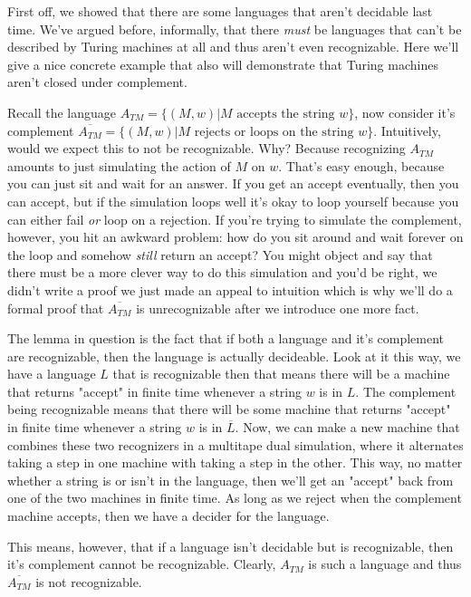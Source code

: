 \documentclass[11pt]{article}
\begin{document}
First off, we showed that there are some languages that aren't decidable last time. We've argued before, informally, that there \emph{must} be languages that can't be described by Turing machines at all and thus aren't even recognizable. Here we'll give a nice concrete example that also will demonstrate that Turing machines aren't closed under complement. 

Recall the language $A_{TM} = \{(M,w) | M \text{ accepts the string } w\}$, now consider it's complement $\overline{A_{TM}} = \{(M,w) | M \text{ rejects or loops on the string } w\}$. Intuitively, would we expect this to not be recognizable. Why? Because recognizing $A_{TM}$ amounts to just simulating the action of $M$ on $w$. That's easy enough, because you can just sit and wait for an answer. If you get an accept eventually, then you can accept, but if the simulation loops well it's okay to loop yourself because you can either fail \emph{or} loop on a rejection. If you're trying to simulate the complement, however, you hit an awkward problem: how do you sit around and wait forever on the loop and somehow \emph{still} return an accept? You might object and say that there must be a more clever way to do this simulation and you'd be right, we didn't write a proof we just made an appeal to intuition which is why we'll do a formal proof that $\overline{A_{TM}}$ is unrecognizable after we introduce one more fact. 

The lemma in question is the fact that if both a language and it's complement are recognizable, then the language is actually decideable. Look at it this way, we have a language $L$ that is recognizable then that means there will be a machine that returns "accept" in finite time whenever a string $w$ is in $L$. The complement being recognizable means that there will be some machine that returns "accept" in finite time whenever a string $w$ is in $\overline{L}$. Now, we can make a new machine that combines these two recognizers in a multitape dual simulation, where it alternates taking a step in one machine with taking a step in the other. This way, no matter whether a string is or isn't in the language, then we'll get an "accept" back from one of the two machines in finite time. As long as we reject when the complement machine accepts, then we have a decider for the language. 

This means, however, that if a language isn't decidable but is recognizable, then it's complement cannot be recognizable. Clearly, $A_{TM}$ is such a language and thus $\overline{A_{TM}}$ is not recognizable.
\end{document}
